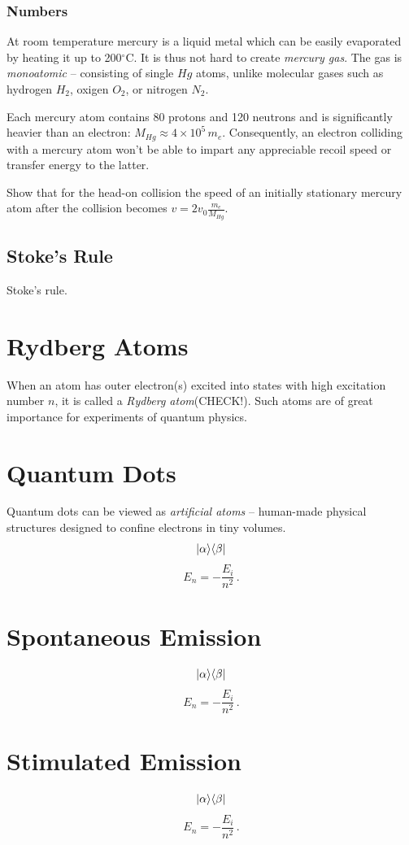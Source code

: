 \subsubsection*{Numbers}
At room temperature mercury is a liquid metal which can be easily evaporated by heating it up to 200$^\circ$C. It is thus not hard to create \emph{mercury gas}. The gas is \emph{monoatomic} -- consisting of single $Hg$ atoms, unlike molecular gases such as hydrogen $H_2$, oxigen $O_2$, or nitrogen $N_2$.

Each mercury atom contains 80 protons and 120 neutrons and is significantly heavier than an electron: $M_{Hg}\approx 4\times 10^5\,m_e$.  Consequently, an electron colliding with a mercury atom won't be able to impart any appreciable recoil speed or transfer energy to the latter. 
\begin{exercise}
	Show that for the head-on collision the speed of an initially stationary mercury atom after the collision becomes $v=2v_0\frac{m_e}{M_{Hg}}$.
\end{exercise}

\subsection{Stoke's Rule}
Stoke's rule.

\section{Rydberg Atoms}
When an atom has outer electron(s) excited into states with high excitation number  $n$, it is called a \emph{Rydberg atom}(CHECK!). Such atoms are of great importance for experiments of quantum physics.

\section{Quantum Dots}
Quantum dots can be viewed as \emph{artificial atoms} -- human-made physical structures designed to confine electrons in tiny volumes.
\[
|{\alpha}\rangle\langle{\beta}|
\]
\[
E_n = -\frac{E_i}{n^2}\,.
\]

\section{Spontaneous Emission}
\[
|{\alpha}\rangle\langle{\beta}|
\]
\[
E_n = -\frac{E_i}{n^2}\,.
\]

\section{Stimulated Emission}
\[
|{\alpha}\rangle\langle{\beta}|
\]
\[
E_n = -\frac{E_i}{n^2}\,.
\]

